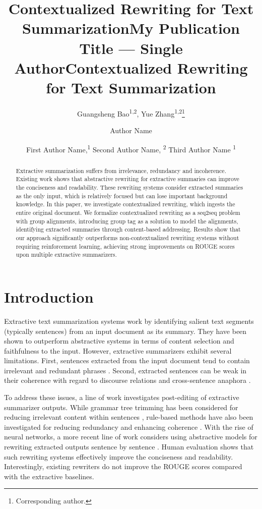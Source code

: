 \documentclass[letterpaper]{article} %
\title{Contextualized Rewriting for Text Summarization}
\author {
    Guangsheng Bao\textsuperscript{\rm 1,2},
    Yue Zhang\textsuperscript{\rm 1,2}\thanks{Corresponding author.}  \\
}
\title{My Publication Title --- Single Author}
\author {
    Author Name \\
}
\title{Contextualized Rewriting for Text Summarization}
\author {
    First Author Name,\textsuperscript{\rm 1}
    Second Author Name, \textsuperscript{\rm 2}
    Third Author Name \textsuperscript{\rm 1} \\
}
\begin{document}
\maketitle

\begin{abstract}
Extractive summarization suffers from irrelevance, redundancy and incoherence. Existing work shows that abstractive rewriting for extractive summaries can improve the conciseness and readability. These rewriting systems consider extracted summaries as the only input, which is relatively focused but can lose important background knowledge. In this paper, we investigate contextualized rewriting, which ingests the entire original document. We formalize contextualized rewriting as a seq2seq problem with group alignments, introducing group tag as a solution to model the alignments,  identifying extracted summaries through content-based addressing. Results show that our approach significantly outperforms non-contextualized rewriting systems without requiring reinforcement learning, achieving strong improvements on ROUGE scores upon multiple extractive summarizers.
\end{abstract}

\section{Introduction}
Extractive text summarization systems \cite{Nallapati2017, Narayan2018, Liu2019} work by identifying salient text segments (typically sentences) from an input document as its summary. They have been shown to outperform abstractive systems \cite{Rush2015,Nallapati2016,Chopra2016} in terms of content selection and faithfulness to the input. However, extractive summarizers exhibit several limitations. First, sentences extracted from the input document tend to contain irrelevant and redundant phrases \cite{Durrett2016, Chen2018, Gehrmann2019}. Second, extracted sentences can be weak in their coherence with regard to discourse relations and cross-sentence anaphora \cite{Dorr2003, Cheng2016}.

To address these issues, a line of work investigates post-editing of extractive summarizer outputs. While grammar tree trimming has been considered for reducing irrelevant content within sentences \cite{Dorr2003}, rule-based methods have also been investigated for reducing redundancy and enhancing coherence \cite{Durrett2016}. With the rise of neural networks, a more recent line of work considers using abstractive models for rewriting extracted outputs sentence by sentence \cite{Chen2018, Bae2019, Wei2019, Xiao2020}. Human evaluation shows that such rewriting systems effectively improve the conciseness and readability. Interestingly, existing rewriters do not improve the ROUGE scores compared with the extractive baselines.
\end{document}
